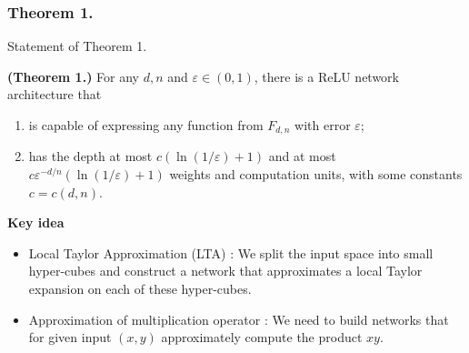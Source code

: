 \documentclass{if-beamer}
\begin{document}
\subsubsection{Theorem 1.}
\begin{frame}{Statement of Theorem 1.}
    \begin{tcolorbox}
    \textbf{(Theorem 1.)}
        For any $d,n$ and $\varepsilon\in(0,1)$, there is a ReLU network architecture that
        \begin{enumerate}
            \item is capable of expressing any function from $F_{d,n}$ with error $\varepsilon$;
            \item has the depth at most $c(\ln(1/\varepsilon)+1)$ and at most $c\varepsilon^{-d/n}(\ln(1/\varepsilon)+1)$ weights and computation units, with some constants $c=c(d,n)$.
        \end{enumerate}
    \end{tcolorbox}
    \textbf{Key idea}
     \begin{itemize}
        \item Local Taylor Approximation (LTA) : We split the input space into small hyper-cubes and construct a network that approximates a local Taylor expansion on each of these hyper-cubes.
        \item Approximation of multiplication operator : We need to build networks that for given input $(x,y)$ approximately compute the product $xy$. 
    \end{itemize}
\end{frame}
\end{document}
